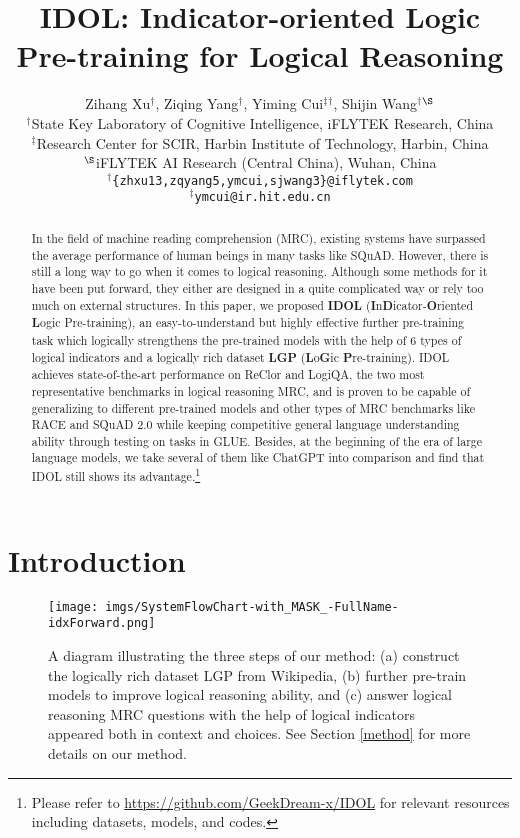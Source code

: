 \documentclass[11pt]{article}
\title{IDOL: Indicator-oriented Logic Pre-training for Logical Reasoning}
\author{
Zihang Xu$^\dag$,
Ziqing Yang$^\dag$,
Yiming Cui$^\ddag$$^\dag$,
Shijin Wang$^\dag$$^\S$ \\
{$^\dag$State Key Laboratory of Cognitive Intelligence, iFLYTEK Research, China} \\
{$^\ddag$Research Center for SCIR, Harbin Institute of Technology, Harbin, China 
} \\
{$^\S$iFLYTEK AI Research (Central China), Wuhan, China
} \\
$^\dag$\tt\{zhxu13,zqyang5,ymcui,sjwang3\}@iflytek.com \\
$^\ddag$\tt ymcui@ir.hit.edu.cn}
\begin{document}
\maketitle

\begin{abstract}



In the field of machine reading comprehension (MRC), existing systems have surpassed the average performance of human beings in many tasks like SQuAD. However, there is still a long way to go when it comes to logical reasoning. Although some methods for it have been put forward, they either are designed in a quite complicated way or rely too much on external structures. In this paper, we proposed \textbf{IDOL} (\textbf{I}n\textbf{D}icator-\textbf{O}riented \textbf{L}ogic Pre-training), an easy-to-understand but highly effective further pre-training task which logically strengthens the pre-trained models with the help of 6 types of logical indicators and a logically rich dataset \textbf{LGP} (\textbf{L}o\textbf{G}ic \textbf{P}re-training). IDOL achieves state-of-the-art performance on ReClor and LogiQA, the two most representative benchmarks in logical reasoning MRC, and is proven to be capable of generalizing to different pre-trained models and other types of MRC benchmarks like RACE and SQuAD 2.0 while keeping competitive general language understanding ability through testing on tasks in GLUE. Besides, at the beginning of the era of large language models, we take several of them like ChatGPT into comparison and find that IDOL still shows its advantage.\footnote{Please refer to \url{https://github.com/GeekDream-x/IDOL}  for relevant resources including datasets, models, and codes.}


\end{abstract}

\section{Introduction}

\begin{figure*}
\centering
\texttt{[image: imgs/SystemFlowChart-with\_MASK\_-FullName-idxForward.png]}
\caption{A diagram illustrating the three steps of our method: (a) construct the logically rich dataset LGP from Wikipedia, (b) further pre-train models to improve logical reasoning ability, and (c) answer logical reasoning MRC questions with the help of logical indicators appeared both in context and choices. See Section \ref{method} for more details on our method.}
\label{fig:systemflowchart}
\end{figure*}
\end{document}
